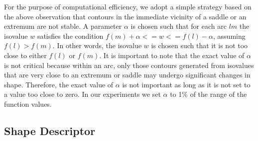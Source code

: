 \documentclass[review,journal]{vgtc}         %
\begin{document}
For the purpose of computational efficiency, we adopt a simple strategy
based on the above observation that contours in the immediate vicinity
of a saddle or an extremum are not stable. A parameter $\alpha$ is chosen
such that for each arc $lm$ the isovalue $w$ satisfies the condition
$f(m)+\alpha <= w <= f(l)-\alpha$, assuming $f(l) > f(m)$. In other words,
the isovalue $w$ is chosen such that it is not too close to either
$f(l)$ or $f(m)$. It is important
to note that the exact value of $\alpha$ is not critical because within an arc,
only those contours generated from isovalues that are very close to an extremum or
saddle may undergo significant changes in shape. Therefore, the exact value of $\alpha$
is not important as long as it is not set to a value too close to zero.
In our experiments we set $\alpha$ to 1\% of the range of the function values. 
%
\subsection{Shape Descriptor}
\end{document}
